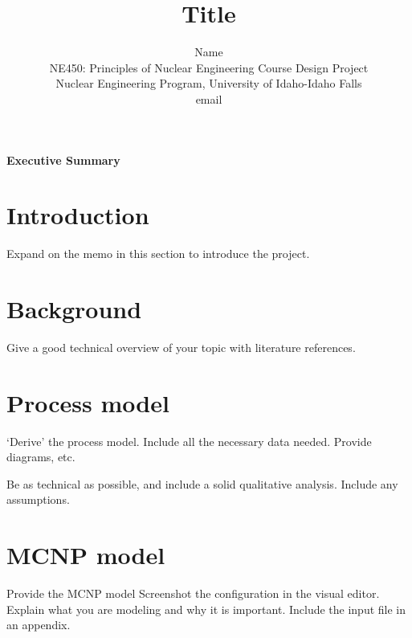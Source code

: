 \documentclass[11pt,a4paper]{article}
\begin{document}
\begin{titlepage}
    \title{Title}
    \author{
        Name \\
        NE450: Principles of Nuclear Engineering Course Design Project\\
        Nuclear Engineering Program, University of Idaho-Idaho Falls \\
        email 
    }
\clearpage %
\maketitle
\thispagestyle{empty} %
\end{titlepage}

\onehalfspacing
\linenumbers
\pagewiselinenumbers
\modulolinenumbers[3] %

\noindent\Large{\textbf{Executive Summary}} \\

\newpage

\section{Introduction}
Expand on the memo in this section to introduce the project.

\newpage

\section{Background}
Give a good technical overview of your topic with literature references.

\newpage

\section{Process model}
‘Derive’ the process model. Include all the necessary data needed. Provide diagrams, etc.

Be as technical as possible, and include a solid qualitative analysis. Include any assumptions.

\newpage

\section{MCNP model}
Provide the MCNP model Screenshot the configuration in the visual editor. Explain what you are modeling and why it is important. Include the input file in an appendix.
\end{document}
